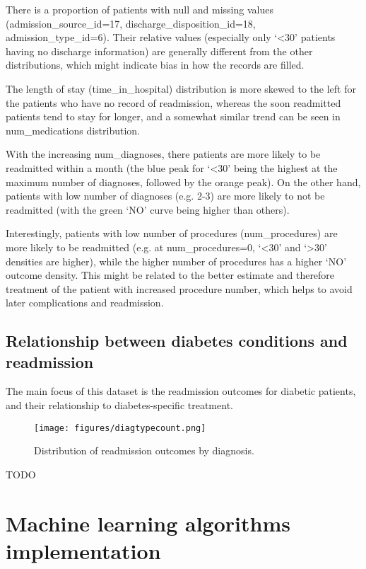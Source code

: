 \documentclass[10pt, twocolumn]{article}
\begin{document}
There is a proportion of patients with null and missing values (admission\_source\_id=17, discharge\_disposition\_id=18, admission\_type\_id=6). Their relative values (especially only `<30' patients having no discharge information) are generally different from the other distributions, which might indicate bias in how the records are filled.

The length of stay (time\_in\_hospital) distribution is more skewed to the left for the patients who have no record of readmission, whereas the soon readmitted patients tend to stay for longer, and a somewhat similar trend can be seen in num\_medications distribution.

With the increasing num\_diagnoses, there patients are more likely to be readmitted within a month (the blue peak for `<30' being the highest at the maximum number of diagnoses, followed by the orange peak). On the other hand, patients with low number of diagnoses (e.g. 2-3) are more likely to not be readmitted (with the green `NO' curve being higher than others).

Interestingly, patients with low number of procedures (num\_procedures) are more likely to be readmitted (e.g. at num\_procedures=0, `<30' and `>30' densities are higher), while the higher number of procedures has a higher `NO' outcome density. This might be related to the better estimate and therefore treatment of the patient with increased procedure number, which helps to avoid later complications and readmission.

\subsection{Relationship between diabetes conditions and readmission}
The main focus of this dataset is the readmission outcomes for diabetic patients, and their relationship to diabetes-specific treatment.


\begin{figure}[htb!]
	\centering
	\texttt{[image: figures/diagtypecount.png]}
	\caption{Distribution of readmission outcomes by diagnosis.}\label{diag}
\end{figure}

\LARGE{TODO}

\normalsize

\section{Machine learning algorithms implementation}
\end{document}
